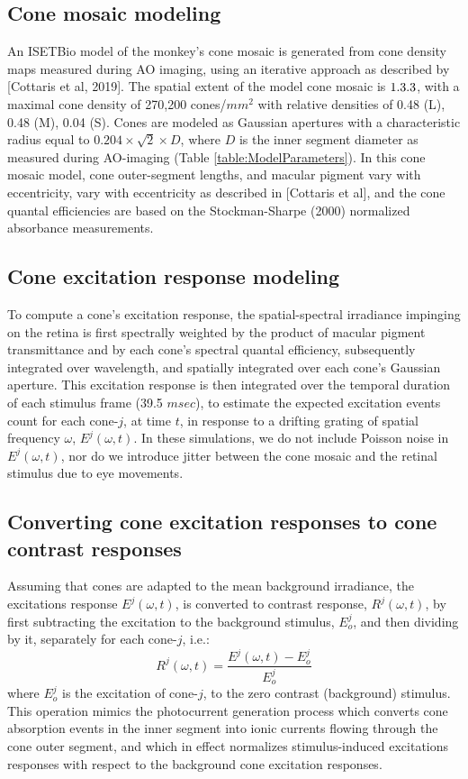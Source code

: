 \documentclass[11pt, oneside]{article}   	%
\begin{document}
\subsection{Cone mosaic modeling}
An ISETBio model of the monkey's cone mosaic is generated from cone density maps measured during AO imaging, using an iterative approach as described by [Cottaris et al, 2019]. The spatial extent of the model cone mosaic is $1.3 \time 1.3$, with a maximal cone density of 270,200 cones/$mm^2$ with relative densities of 0.48 (L), 0.48 (M), 0.04 (S). Cones are modeled as Gaussian apertures with a characteristic radius equal to $0.204 \times \sqrt{2} \times D$, where $D$ is the inner segment diameter as measured during AO-imaging (Table \ref{table:ModelParameters}). In this cone mosaic model, cone outer-segment lengths, and macular pigment vary with eccentricity, vary with eccentricity as described in [Cottaris et al], and the cone quantal efficiencies are based on the Stockman-Sharpe (2000) normalized absorbance measurements. 

\subsection{Cone excitation response modeling}
To compute a cone's excitation response, the spatial-spectral irradiance impinging on the retina is first spectrally weighted by the product of macular pigment transmittance and by each cone's spectral quantal efficiency, subsequently integrated over wavelength, and spatially integrated over each cone's Gaussian aperture. This excitation response is then integrated over the temporal duration of each stimulus frame (39.5 $msec$), to estimate the expected excitation events count for each cone-$j$, at time $t$, in response to a drifting grating of spatial frequency $\omega$, $E^j(\omega,t)$. In these simulations, we do not include Poisson noise in $E^j(\omega,t)$, nor do we introduce jitter between the cone mosaic and the retinal stimulus due to eye movements.


\subsection{Converting cone excitation responses to cone contrast responses}
Assuming that cones are adapted to the mean background irradiance, the excitations response $E^j(\omega,t)$, is converted to contrast response, $R^j(\omega, t)$, by first subtracting the excitation to the background stimulus, $E^j_o$, and then dividing by it, separately for each cone-$j$, i.e.:
\begin{equation}
R^j(\omega, t) = \frac{E^j(\omega,t) - E^j_o}{E^j_o}
\end{equation}
\noindent where
$E^j_o$ is the excitation of cone-$j$, to the zero contrast (background) stimulus. This operation mimics the photocurrent generation process which converts cone absorption events in the inner segment into ionic currents flowing through the cone outer segment, and which in effect normalizes stimulus-induced excitations responses with respect to the background cone excitation responses.
\end{document}

